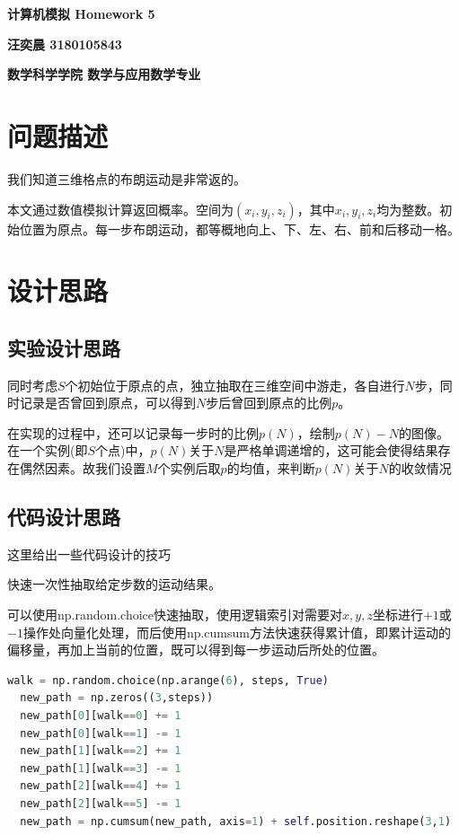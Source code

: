 \documentclass[12pt]{article}
\begin{document}
\pagestyle{fancy}
\setcounter{page}{1}
\vspace{20pt}
\centerline{{\Large \textbf{计算机模拟 Homework 5}}}
\vspace{15pt}

\centerline{{\large \textbf{汪奕晨 3180105843}}}
\vspace{15pt}

\centerline{{\large \textbf{数学科学学院 数学与应用数学专业}}}
\vspace{15pt}

\section{问题描述}
我们知道三维格点的布朗运动是非常返的。

本文通过数值模拟计算返回概率。空间为$(x_i, y_i, z_i)$，其中$x_i, y_i, z_i$均为整数。初始位置为原点。每一步布朗运动，都等概地向上、下、左、右、前和后移动一格。
\section{设计思路}
\subsection{实验设计思路}
同时考虑$S$个初始位于原点的点，独立抽取在三维空间中游走，各自进行$N$步，同时记录是否曾回到原点，可以得到$N$步后曾回到原点的比例$p$。

在实现的过程中，还可以记录每一步时的比例$p(N)$，绘制$p(N)-N$的图像。在一个实例(即$S$个点)中，$p(N)$关于$N$是严格单调递增的，这可能会使得结果存在偶然因素。故我们设置$M$个实例后取$p$的均值，来判断$p(N)$关于$N$的收敛情况


\subsection{代码设计思路}
这里给出一些代码设计的技巧

快速一次性抽取给定步数的运动结果。

可以使用np.random.choice快速抽取，使用逻辑索引对需要对$x,y,z$坐标进行$+1$或$-1$操作处向量化处理，而后使用np.cumsum方法快速获得累计值，即累计运动的偏移量，再加上当前的位置，既可以得到每一步运动后所处的位置。
\begin{lstlisting}[language = Python]
  walk = np.random.choice(np.arange(6), steps, True)
  new_path = np.zeros((3,steps))
  new_path[0][walk==0] += 1
  new_path[0][walk==1] -= 1
  new_path[1][walk==2] += 1
  new_path[1][walk==3] -= 1
  new_path[2][walk==4] += 1
  new_path[2][walk==5] -= 1
  new_path = np.cumsum(new_path, axis=1) + self.position.reshape(3,1)
\end{lstlisting}
\end{document}
